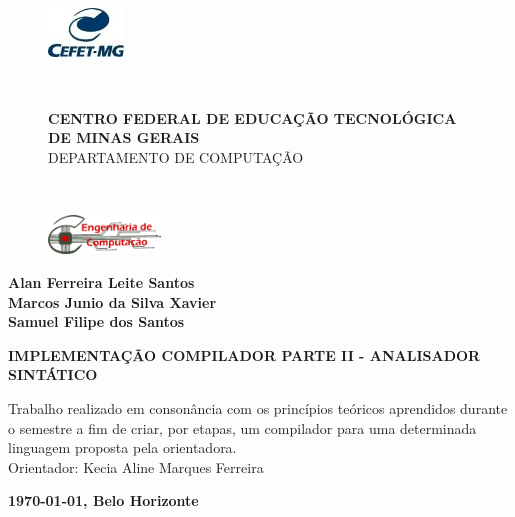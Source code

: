 \thispagestyle{empty}
\begin{center}


\begin{figure}
    \centering
    \hspace{-2.5cm}\begin{minipage}{.1\textwidth}
        \includegraphics[width=2cm]{img/cefet.jpg}
        \end{minipage}\
    \hspace{0.75cm}
	\begin{minipage}{.8\textwidth}
	    \centering \large \textbf{\footnotesize{CENTRO FEDERAL DE EDUCAÇÃO TECNOLÓGICA DE MINAS GERAIS}}\\ \large{DEPARTAMENTO DE COMPUTAÇÃO}
        \end{minipage}\
    \hspace{0.45cm}
    \begin{minipage}{0.1\textwidth}
        \includegraphics[width=3cm]{img/decom.png}
        \end{minipage}
\end{figure}


    \vspace{15mm}
    
    \begin{Large}
        \textbf{ Alan Ferreira Leite Santos \\ Marcos Junio da Silva Xavier \\ Samuel Filipe dos Santos }    
    \end{Large}
    \vspace{4cm}
    
    
    \uppercase{\textbf{\Large Implementação Compilador Parte II - Analisador Sintático}}
\end{center}

\vspace{6cm}

\begin{flushright}
    \begin{minipage}{20em}%
        Trabalho realizado em consonância com os princípios teóricos aprendidos durante o semestre a fim de criar, por etapas, um compilador para uma determinada linguagem proposta pela  orientadora.\\
        Orientador: Kecia Aline Marques Ferreira

    \end{minipage}

\end{flushright}


\vfill
\begin{center}
    \textbf{\large \monthyeardate\today, Belo Horizonte}
\end{center}
\clearpage
